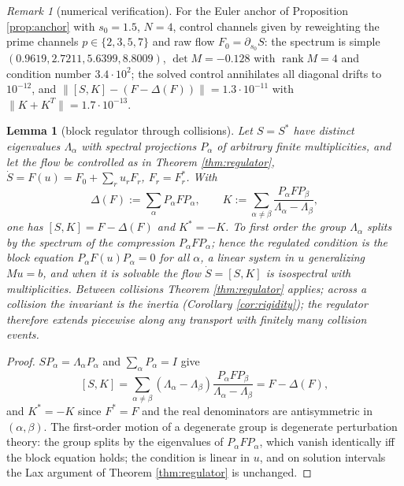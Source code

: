 \documentclass[11pt]{article}
\theoremstyle{plain}
\newtheorem{lemma}[theorem]{Lemma}
\theoremstyle{definition}
\theoremstyle{remark}
\newtheorem{remark}[theorem]{Remark}
\DeclareMathOperator{\rank}{rank}
\begin{document}
\begin{remark}[numerical verification]\label{rem:channels}
For the Euler anchor of Proposition \ref{prop:anchor} with $s_0=1.5$, $N=4$, control
channels given by reweighting the prime channels $p\in\{2,3,5,7\}$ and raw flow
$F_0=\partial_{s_0}S$: the spectrum is simple $(0.9619,2.7211,5.6399,8.8009)$,
$\det M=-0.128$ with $\rank M=4$ and condition number $3.4\cdot10^{2}$; the solved
control annihilates all diagonal drifts to $10^{-12}$, and
$\|[S,K]-(F-\Delta(F))\|=1.3\cdot10^{-11}$ with $\|K+K^{T}\|=1.7\cdot10^{-13}$.
\end{remark}

\begin{lemma}[block regulator through collisions]\label{lem:block}
Let $S=S^{*}$ have distinct eigenvalues $\Lambda_\alpha$ with spectral projections
$P_\alpha$ of arbitrary finite multiplicities, and let the flow be controlled as in
Theorem \ref{thm:regulator}, $\dot S=F(u)=F_0+\sum_ru_rF_r$, $F_r=F_r^{*}$. With
\[
  \Delta(F):=\sum_\alpha P_\alpha FP_\alpha,
  \qquad
  K:=\sum_{\alpha\ne\beta}\frac{P_\alpha FP_\beta}{\Lambda_\alpha-\Lambda_\beta},
\]
one has $[S,K]=F-\Delta(F)$ and $K^{*}=-K$. To first order the group $\Lambda_\alpha$
splits by the spectrum of the compression $P_\alpha FP_\alpha$; hence the regulated
condition is the block equation $P_\alpha F(u)P_\alpha=0$ for all $\alpha$, a linear
system in $u$ generalizing $Mu=b$, and when it is solvable the flow $\dot S=[S,K]$ is
isospectral with multiplicities. Between collisions Theorem \ref{thm:regulator}
applies; across a collision the invariant is the inertia (Corollary
\ref{cor:rigidity}); the regulator therefore extends piecewise along any transport
with finitely many collision events.
\end{lemma}

\begin{proof}
$SP_\alpha=\Lambda_\alpha P_\alpha$ and $\sum_\alpha P_\alpha=I$ give
\[
  [S,K]=\sum_{\alpha\ne\beta}(\Lambda_\alpha-\Lambda_\beta)
  \frac{P_\alpha FP_\beta}{\Lambda_\alpha-\Lambda_\beta}
  =F-\Delta(F),
\]
and $K^{*}=-K$ since $F^{*}=F$ and the real denominators are antisymmetric in
$(\alpha,\beta)$. The first-order motion of a degenerate group is degenerate
perturbation theory: the group splits by the eigenvalues of $P_\alpha FP_\alpha$,
which vanish identically iff the block equation holds; the condition is linear in
$u$, and on solution intervals the Lax argument of Theorem \ref{thm:regulator} is
unchanged.
\end{proof}
\end{document}
